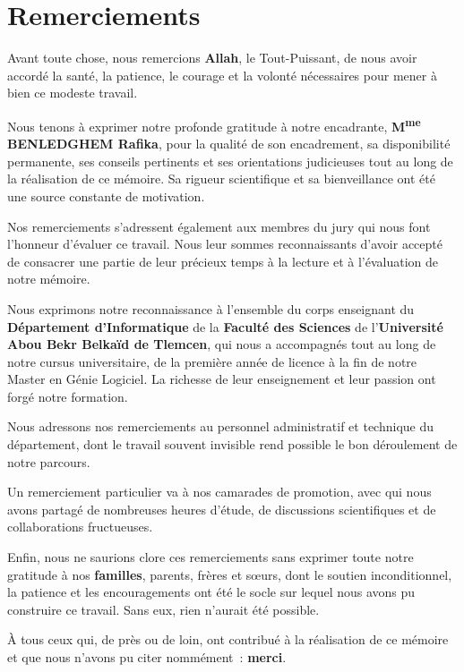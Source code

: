 \chapter*{Remerciements}
\thispagestyle{empty}

Avant toute chose, nous remercions \textbf{Allah}, le Tout-Puissant, de nous avoir accordé la santé, la patience, le courage et la volonté nécessaires pour mener à bien ce modeste travail.

Nous tenons à exprimer notre profonde gratitude à notre encadrante, \textbf{M\textsuperscript{me} BENLEDGHEM Rafika}, pour la qualité de son encadrement, sa disponibilité permanente, ses conseils pertinents et ses orientations judicieuses tout au long de la réalisation de ce mémoire. Sa rigueur scientifique et sa bienveillance ont été une source constante de motivation.

Nos remerciements s'adressent également aux membres du jury qui nous font l'honneur d'évaluer ce travail. Nous leur sommes reconnaissants d'avoir accepté de consacrer une partie de leur précieux temps à la lecture et à l'évaluation de notre mémoire.

Nous exprimons notre reconnaissance à l'ensemble du corps enseignant du \textbf{Département d'Informatique} de la \textbf{Faculté des Sciences} de l'\textbf{Université Abou Bekr Belkaïd de Tlemcen}, qui nous a accompagnés tout au long de notre cursus universitaire, de la première année de licence à la fin de notre Master en Génie Logiciel. La richesse de leur enseignement et leur passion ont forgé notre formation.

Nous adressons nos remerciements au personnel administratif et technique du département, dont le travail souvent invisible rend possible le bon déroulement de notre parcours.

Un remerciement particulier va à nos camarades de promotion, avec qui nous avons partagé de nombreuses heures d'étude, de discussions scientifiques et de collaborations fructueuses.

Enfin, nous ne saurions clore ces remerciements sans exprimer toute notre gratitude à nos \textbf{familles}, parents, frères et sœurs, dont le soutien inconditionnel, la patience et les encouragements ont été le socle sur lequel nous avons pu construire ce travail. Sans eux, rien n'aurait été possible.

À tous ceux qui, de près ou de loin, ont contribué à la réalisation de ce mémoire et que nous n'avons pu citer nommément~: \textbf{merci}.
